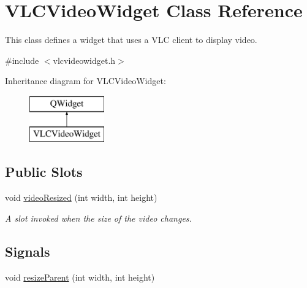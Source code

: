 \hypertarget{classVLCVideoWidget}{\section{V\-L\-C\-Video\-Widget Class Reference}
\label{classVLCVideoWidget}
}


This class defines a widget that uses a V\-L\-C client to display video.  




{\ttfamily \#include $<$vlcvideowidget.\-h$>$}

Inheritance diagram for V\-L\-C\-Video\-Widget\-:\begin{figure}[H]
\begin{center}
\leavevmode
\includegraphics[height=2.000000cm]{classVLCVideoWidget}
\end{center}
\end{figure}
\subsection*{Public Slots}
\begin{DoxyCompactItemize}
\item 
void \hyperlink{classVLCVideoWidget_aff4501569b0e46b3641625c3c9bbd5c6}{video\-Resized} (int width, int height)
\begin{DoxyCompactList}\small\item\em A slot invoked when the size of the video changes. \end{DoxyCompactList}\end{DoxyCompactItemize}
\subsection*{Signals}
\begin{DoxyCompactItemize}
\item 
void \hyperlink{classVLCVideoWidget_aeff3477d9c077d45b0ff8caea2514150}{resize\-Parent} (int width, int height)
\end{DoxyCompactItemize}

